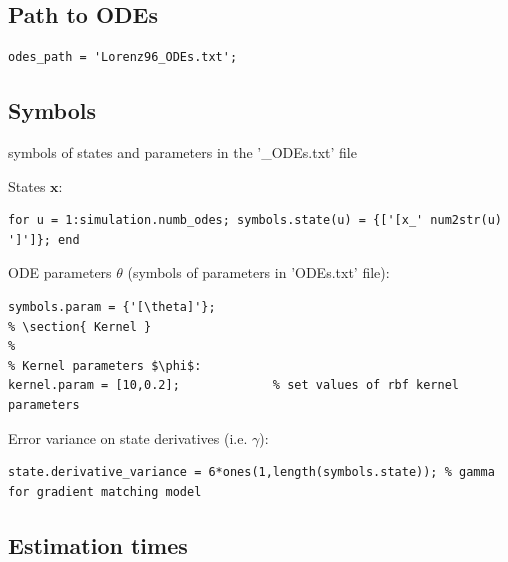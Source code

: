 \begin{par}
\subsection{ Path to ODEs }
\end{par} \vspace{1em}
\color{RoyalPurple}\begin{verbatim}
odes_path = 'Lorenz96_ODEs.txt';
\end{verbatim}
\color{black}
\begin{par}
\subsection{ Symbols } symbols of states and parameters in the '\_ODEs.txt' file
\end{par} \vspace{1em}
\begin{par}
States $\mathbf{x}$:
\end{par} \vspace{1em}
\color{RoyalPurple}\begin{verbatim}
for u = 1:simulation.numb_odes; symbols.state(u) = {['[x_' num2str(u) ']']}; end
\end{verbatim}
\color{black}
\begin{par}
ODE parameters $\theta$ (symbols of parameters in 'ODEs.txt' file):
\end{par} \vspace{1em}
\color{RoyalPurple}\begin{verbatim}
symbols.param = {'[\theta]'};
% \section{ Kernel }
%
% Kernel parameters $\phi$:
kernel.param = [10,0.2];             % set values of rbf kernel parameters
\end{verbatim}
\color{black}
\begin{par}
Error variance on state derivatives (i.e. $\gamma$):
\end{par} \vspace{1em}
\color{RoyalPurple}\begin{verbatim}
state.derivative_variance = 6*ones(1,length(symbols.state)); % gamma for gradient matching model
\end{verbatim}
\color{black}
\begin{par}
\subsection{ Estimation times }
\end{par} \vspace{1em}
